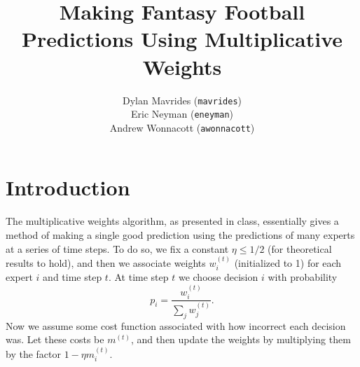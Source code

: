 \documentclass[12pt, final, onecolumn, titlepage]{article}
\theoremstyle{definition}
\begin{document}
\title{Making Fantasy Football Predictions Using Multiplicative Weights}

\author{Dylan Mavrides (\texttt{mavrides})\\Eric Neyman (\texttt{eneyman})\\Andrew Wonnacott (\texttt{awonnacott})}

\maketitle

\tableofcontents

\newpage

\section{Introduction}
The multiplicative weights algorithm, as presented in class, essentially gives a method of making a single good prediction using the predictions of many experts at a series of time steps. To do so, we fix a constant $\eta \leq 1/2$ (for theoretical results to hold), and then we associate weights $w_{i}^{(t)}$ (initialized to 1) for each expert $i$ and time step $t$. At time step $t$ we choose decision $i$ with probability
\[p_i = \frac{w_i^{(t)}}{\sum_{j}w_j^{(t)}}.\]
Now we assume some cost function associated with how incorrect each decision was. Let these costs be $m^{(t)}$, and then update the weights by multiplying them by the factor $1-\eta m_i^{(t)}$.
\end{document}
